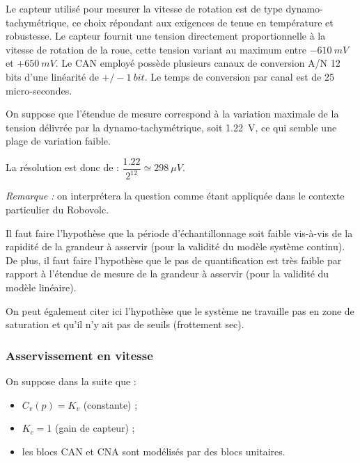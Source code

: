 Le capteur utilisé pour mesurer la vitesse de rotation est de type dynamo-tachymétrique, ce choix
répondant aux exigences de tenue en température et robustesse. Le capteur fournit une tension
directement proportionnelle à la vitesse de rotation de la roue, cette tension variant au maximum
entre $-\SI{610}{mV}$ et $+\SI{650}{mV}$. Le CAN employé possède plusieurs canaux de conversion A/N 12 bits
d'une linéarité de $+/-\SI{1}{bit}$. Le temps de conversion par canal est de 25 micro-secondes.

\ifprof
\begin{corrige}
On suppose que l’étendue de mesure correspond à la variation maximale de la tension délivrée  
par la dynamo-tachymétrique, soit \SI{1,22}{V}, ce qui semble une plage de variation faible.

La résolution est donc de : $\dfrac{1.22}{2^{12}} \simeq \SI{298}{\mu V}$. 

\end{corrige}
\else
\fi

\ifprof
\begin{corrige}
\textit{Remarque :} on interprétera la question comme étant appliquée dans le contexte particulier du Robovolc.


Il faut faire l’hypothèse que la période d’échantillonnage soit faible vis-à-vis de la rapidité de la grandeur à asservir (pour la validité du modèle système continu). De plus, il faut faire l’hypothèse que le pas de quantification est très faible par rapport à l’étendue de mesure de la grandeur à asservir (pour la validité du modèle linéaire).

On peut également citer ici l’hypothèse que le système ne travaille pas en zone de saturation et qu’il n’y ait pas de seuils (frottement sec). 

\end{corrige}
\else
\fi

\subsubsection{Asservissement en vitesse}

On suppose dans la suite que :
\begin{itemize}
\item $C_v ( p)=K_v$ (constante) ;
\item $K_c =1$ (gain de capteur) ;
\item  les blocs CAN et CNA sont modélisés par des blocs unitaires.
\end{itemize}

